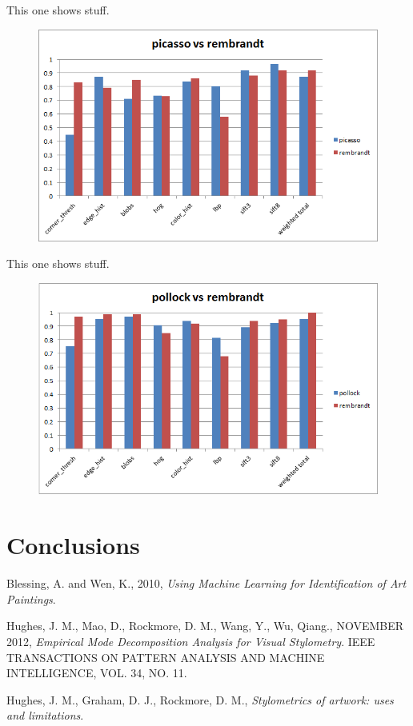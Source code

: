 \documentclass[twocolumn]{article}
\begin{document}
  This one shows stuff.
  \begin{figure}
    \begin{center}
      \includegraphics{graphs/picasso_rembrandt.png}
    \end{center}
  \end{figure}

  This one shows stuff.
  \begin{figure}
    \begin{center}
      \includegraphics{graphs/pollock_rembrandt.png}
    \end{center}
  \end{figure}

  \section{Conclusions}

  \begin{thebibliography}{1}
     Blessing, A. and Wen, K.,
    2010,
    \emph{Using Machine Learning for Identification of Art Paintings}.
  
     Hughes, J. M., Mao, D., Rockmore, D. M.,
    Wang, Y., Wu, Qiang.,
    NOVEMBER 2012,
    \emph{Empirical Mode Decomposition Analysis for Visual Stylometry}.
    IEEE TRANSACTIONS ON PATTERN ANALYSIS AND MACHINE INTELLIGENCE,
    VOL. 34,
    NO. 11.
  
     Hughes, J. M., Graham, D. J., Rockmore, D. M.,
    \emph{Stylometrics of artwork: uses and limitations}.
  
  \end{thebibliography}
\end{document}
